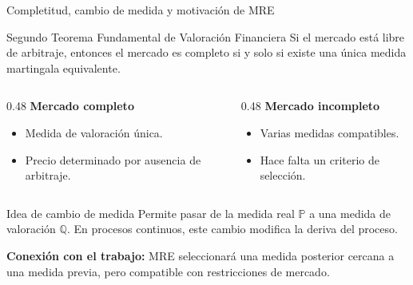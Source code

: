 \documentclass[8pt]{beamer}
\begin{document}
\begin{frame}{Completitud, cambio de medida y motivación de MRE}
\begin{block}{Segundo Teorema Fundamental de Valoración Financiera}
Si el mercado está libre de arbitraje, entonces el mercado es completo si y solo si existe una única medida martingala equivalente.
\end{block}
\pause

\begin{columns}[T]
\begin{column}{0.48\textwidth}
\textbf{Mercado completo}

\begin{itemize}
    \item Medida de valoración única.
    \item Precio determinado por ausencia de arbitraje.
\end{itemize}

\end{column}
\begin{column}{0.48\textwidth}
\textbf{Mercado incompleto}

\begin{itemize}
    \item Varias medidas compatibles.
    \item Hace falta un criterio de selección.
\end{itemize}

\end{column}
\end{columns}
\pause

\begin{block}{Idea de cambio de medida}
Permite pasar de la medida real $\mathbb P$ a una medida de valoración $\mathbb Q$. En procesos continuos, este cambio modifica la deriva del proceso.
\end{block}
\pause

\begin{center}
\textbf{Conexión con el trabajo:} MRE seleccionará una medida posterior cercana a una medida previa, pero compatible con restricciones de mercado.
\end{center}
\end{frame}
\end{document}
